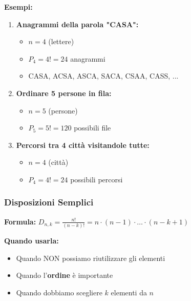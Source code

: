 \textbf{Esempi:}
\begin{enumerate}
    \item \textbf{Anagrammi della parola "CASA":}
    \begin{itemize}
        \item $n=4$ (lettere)
        \item $P_4 = 4! = 24$ anagrammi
        \item CASA, ACSA, ASCA, SACA, CSAA, CASS, ...
    \end{itemize}

    \item \textbf{Ordinare 5 persone in fila:}
    \begin{itemize}
        \item $n=5$ (persone)
        \item $P_5 = 5! = 120$ possibili file
    \end{itemize}

    \item \textbf{Percorsi tra 4 città visitandole tutte:}
    \begin{itemize}
        \item $n=4$ (città)
        \item $P_4 = 4! = 24$ possibili percorsi
    \end{itemize}
\end{enumerate}

\subsubsection{Disposizioni Semplici}
\textbf{Formula:} $D_{n,k} = \frac{n!}{(n-k)!} = n \cdot (n-1) \cdot \dots \cdot (n-k+1)$

\textbf{Quando usarla:}
\begin{itemize}
    \item Quando NON possiamo riutilizzare gli elementi
    \item Quando l'\textbf{ordine} è importante
    \item Quando dobbiamo scegliere $k$ elementi da $n$
\end{itemize}

